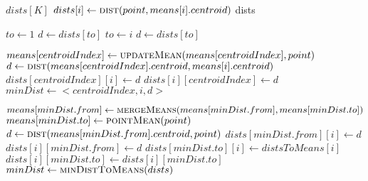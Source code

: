 \documentclass[a4paper, 12pt]{article}
\begin{document}
\begin{algorithm}[H]
\begin{algorithmic}[1]
\State \(dists[K]\)
\State \(dists[i] \gets \Call{dist}{point, means[i].centroid}\)
\EndFor
\State \Return dists
\EndFunction
\end{algorithmic}
\end{algorithm}
\begin{algorithm}[H]
\begin{algorithmic}[1]
\State \(to \gets 1\)
\State \(d \gets dists[to]\)
\State \(to \gets i\)
\State \(d \gets dists[to]\)
\EndIf
\EndFor
\State \Return \(<to, d>\)
\EndFunction
\end{algorithmic}
\end{algorithm}
\begin{algorithm}[H]
\begin{algorithmic}[1]
\State \(means[centroidIndex] \gets \Call{updateMean}{means[centroidIndex], point}\)
\State \(d \gets \Call{dist}{means[centroidIndex].centroid, means[i].centroid}\)
\State \(dists[centroidIndex][i] \gets d\)
\State \(dists[i][centroidIndex] \gets d\)
\State \(minDist \gets <centroidIndex, i, d>\)
\EndIf
\EndIf
\EndFor
\EndFunction
\end{algorithmic}
\end{algorithm}
\begin{algorithm}[H]
\begin{algorithmic}[1]
\State \(means[minDist.from] \gets \Call{mergeMeans}{means[minDist.from], means[minDist.to]}\)
\State \(means[minDist.to] \gets \Call{pointMean}{point}\)
\State \(d \gets \Call{dist}{means[minDist.from].centroid, point}\)
\State \(dists[minDist.from][i] \gets d\)
\State \(dists[i][minDist.from] \gets d\)
\EndIf
{}
\State \(dists[minDist.to][i] \gets distsToMeans[i]\)
\State \(dists[i][minDist.to] \gets dists[i][minDist.to]\)
\EndIf
\EndFor
\State \(minDist \gets \Call{minDistToMeans}{dists}\)
\EndFunction
\end{algorithmic}
\end{algorithm}
\end{document}
